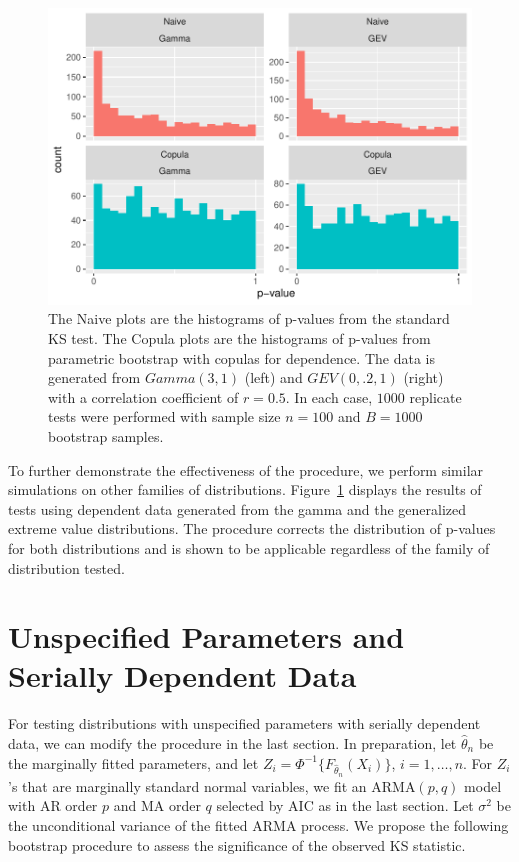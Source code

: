 \documentclass[12pt, letterpaper, titlepage]{article}
\begin{document}
\begin{figure}[tbp]
  \centering
  \includegraphics[width=\textwidth]{hist_gamma_gev_D}
  \caption{The Naive plots are the histograms of p-values from the standard KS
  test. The Copula plots are the histograms of p-values from parametric
  bootstrap with copulas for dependence. The data is generated from $Gamma(3,
  1)$ (left) and $GEV(0, .2, 1)$ (right) with a correlation coefficient of $r =
  0.5$. In each case, $1000$ replicate tests were performed with sample size $n
  = 100$ and $B = 1000$ bootstrap samples.}
  \label{fig:hist_gamma_gev_D}
\end{figure}

To further demonstrate the effectiveness of the procedure, we perform similar
simulations on other families of distributions.
Figure~\ref{fig:hist_gamma_gev_D} displays the results of tests using dependent
data generated from the gamma and the generalized extreme value distributions.
The procedure corrects the distribution of p-values for both distributions and
is shown to be applicable regardless of the family of distribution tested.


\section{Unspecified Parameters and Serially Dependent Data}
\label{sec:fittedwithdependence}

For testing distributions with unspecified parameters with serially dependent
data, we can modify the procedure in the last section. In preparation, let
$\hat\theta_n$ be the marginally fitted parameters, and let
$Z_i = \Phi^{-1} \{F_{\hat\theta_n}(X_i)\}$, $i = 1, \ldots, n$.
For $Z_i$'s that are marginally standard normal variables, we fit an
ARMA$(p,q)$ model with AR order $p$ and MA order $q$ selected by AIC as in the
last section. Let $\sigma^2$ be the unconditional variance of the fitted ARMA
process. We propose the following bootstrap procedure to assess the
significance of the observed KS statistic.
\end{document}
